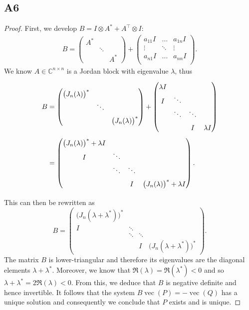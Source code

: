 \documentclass[11pt]{article}
\newcommand{\kp}{\otimes}
\DeclareMathOperator{\vect}{vec}
\newcommand{\complex}{\mathbb{C}} %
\begin{document}
\subsection*{A6}
\begin{proof}
First, we develop $B=I\kp A^*+A^\top\kp I$:
\begin{align*}
    B=
    \begin{pmatrix}
    A^* & & \\
    &\ddots&\\
    & & A^*
    \end{pmatrix}+
    \begin{pmatrix}
    a_{11} I & \dots & a_{1n} I\\
    \vdots & \ddots & \vdots\\
    a_{n1} I & \dots & a_{nn} I\\
    \end{pmatrix}.
\end{align*}
We know $A\in\complex^{n\times n}$ is a Jordan block with eigenvalue $\lambda$, thus
\begin{align*}
    B&=
    \renewcommand{\arraystretch}{1.5}
    \begin{pmatrix}
    \big(J_n(\lambda)\big)^* & & \\
    &\ddots&\\
    & & \big(J_n(\lambda)\big)^*
    \end{pmatrix}+
    \begin{pmatrix}
    \lambda I & & &\\
    I & \ddots & &\\
    & \ddots & \ddots &\\
    & & I & \lambda I
    \end{pmatrix}\\
    &=\begin{pmatrix}
    \big(J_n(\lambda)\big)^*+\lambda I &  &  & \\
    I & \ddots & &\\
    & \ddots & \ddots &\\
    & & I & \big(J_n(\lambda)\big)^*+\lambda I
    \end{pmatrix}.
\end{align*}

This can then be rewritten as
\[
    B =\begin{pmatrix}
    \big(J_n(\lambda+\lambda^*)\big)^* & & & \\
    I & \ddots & &\\
    & \ddots & \ddots &\\
    & & I & \big(J_n(\lambda+\lambda^*)\big)^*
    \end{pmatrix}.
\]
The matrix \(B\) is lower-triangular and therefore its eigenvalues are the diagonal elements $\lambda+\lambda^*$.
Moreover, we know that $\Re(\lambda) = \Re(\lambda^*) <0$ and so $\lambda+\lambda^*=2 \Re(\lambda)<0$.
From this, we deduce that $B$ is negative definite and hence invertible.
It follows that the system $B\vect(P)=-\vect(Q)$ has a unique solution and consequently we conclude that \(P\) exists and is unique.
\end{proof}
\end{document}
